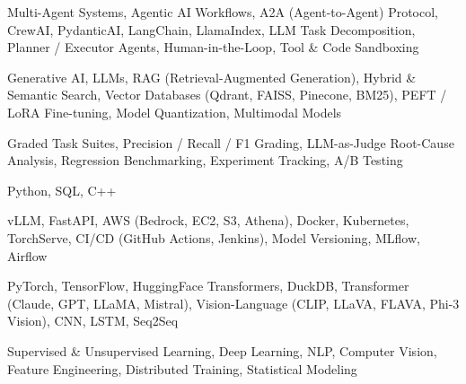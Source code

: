 \documentclass[letter,10pt]{article}
\begin{document}
 Multi-Agent Systems, Agentic AI Workflows, A2A (Agent-to-Agent) Protocol, CrewAI, PydanticAI, LangChain, LlamaIndex, LLM Task Decomposition, Planner / Executor Agents, Human-in-the-Loop, Tool \& Code Sandboxing\par\vspace{2pt}

 Generative AI, LLMs, RAG (Retrieval-Augmented Generation), Hybrid \& Semantic Search, Vector Databases (Qdrant, FAISS, Pinecone, BM25), PEFT / LoRA Fine-tuning, Model Quantization, Multimodal Models\par\vspace{2pt}

 Graded Task Suites, Precision / Recall / F1 Grading, LLM-as-Judge Root-Cause Analysis, Regression Benchmarking, Experiment Tracking, A/B Testing\par\vspace{2pt}

 Python, SQL, C++\par\vspace{2pt}

 vLLM, FastAPI, AWS (Bedrock, EC2, S3, Athena), Docker, Kubernetes, TorchServe, CI/CD (GitHub Actions, Jenkins), Model Versioning, MLflow, Airflow\par\vspace{2pt}

 PyTorch, TensorFlow, HuggingFace Transformers, DuckDB, Transformer (Claude, GPT, LLaMA, Mistral), Vision-Language (CLIP, LLaVA, FLAVA, Phi-3 Vision), CNN, LSTM, Seq2Seq\par\vspace{2pt}

 Supervised \& Unsupervised Learning, Deep Learning, NLP, Computer Vision, Feature Engineering, Distributed Training, Statistical Modeling
\end{document}
